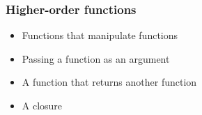 \documentclass[14pt,compress,aspectratio=169]{beamer}
\begin{document}
\begin{frame}[fragile]
  \frametitle{Higher-order functions}
  \begin{itemize}
  \item Functions that manipulate functions
  \item Passing a function as an argument
  \item A function that returns another function
  \item A closure
  \end{itemize}
\end{frame}
\end{document}

